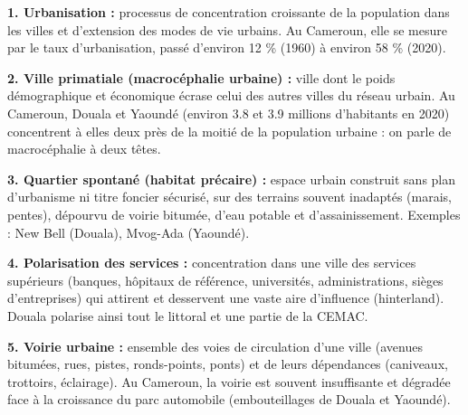 \documentclass[11pt]{article}
\newcommand{\cle}[1]{{\popxbold\color{popdark}#1}}
\begin{document}
\begin{corrige}
\textbf{1. Urbanisation :} processus de concentration croissante de la population dans les villes et d'extension des modes de vie urbains. Au Cameroun, elle se mesure par le taux d'urbanisation, passé d'environ \num{12} \% (1960) à environ \num{58} \% (2020).

\textbf{2. Ville primatiale (macrocéphalie urbaine) :} ville dont le poids démographique et économique écrase celui des autres villes du réseau urbain. Au Cameroun, Douala et Yaoundé (environ \num{3,8} et \num{3,9} millions d'habitants en 2020) concentrent à elles deux près de la moitié de la population urbaine : on parle de \cle{macrocéphalie} à deux têtes.

\textbf{3. Quartier spontané (habitat précaire) :} espace urbain construit sans plan d'urbanisme ni titre foncier sécurisé, sur des terrains souvent inadaptés (marais, pentes), dépourvu de voirie bitumée, d'eau potable et d'assainissement. Exemples : New Bell (Douala), Mvog-Ada (Yaoundé).

\textbf{4. Polarisation des services :} concentration dans une ville des services supérieurs (banques, hôpitaux de référence, universités, administrations, sièges d'entreprises) qui attirent et desservent une vaste aire d'influence (hinterland). Douala polarise ainsi tout le littoral et une partie de la CEMAC.

\textbf{5. Voirie urbaine :} ensemble des voies de circulation d'une ville (avenues bitumées, rues, pistes, ronds-points, ponts) et de leurs dépendances (caniveaux, trottoirs, éclairage). Au Cameroun, la voirie est souvent insuffisante et dégradée face à la croissance du parc automobile (embouteillages de Douala et Yaoundé).
\end{corrige}
\end{document}
